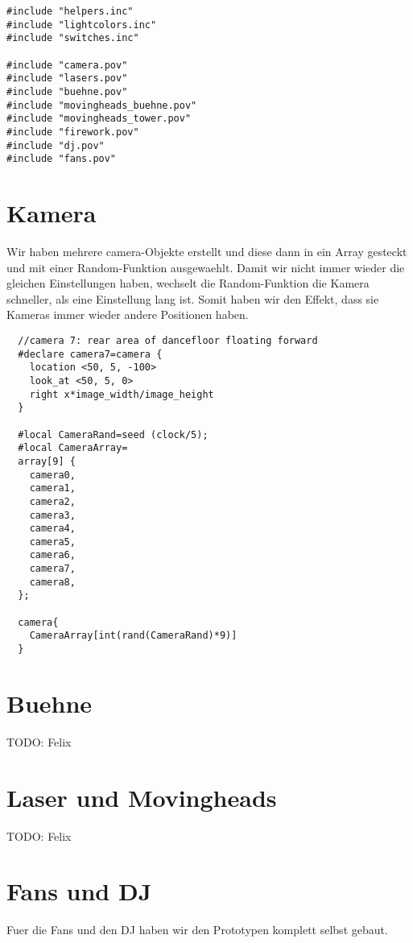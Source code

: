 \documentclass[paper=a4]{scrartcl}
\begin{document}
\begin{lstlisting}
#include "helpers.inc"
#include "lightcolors.inc"
#include "switches.inc"

#include "camera.pov"
#include "lasers.pov"
#include "buehne.pov"
#include "movingheads_buehne.pov"
#include "movingheads_tower.pov"
#include "firework.pov"
#include "dj.pov"
#include "fans.pov"
\end{lstlisting}

\section{Kamera}
Wir haben mehrere camera-Objekte erstellt und diese dann in ein Array gesteckt und mit einer Random-Funktion ausgewaehlt.
Damit wir nicht immer wieder die gleichen Einstellungen haben, wechselt die Random-Funktion die Kamera schneller, als eine Einstellung lang ist.
Somit haben wir den Effekt, dass sie Kameras immer wieder andere Positionen haben.
\begin{lstlisting}
  //camera 7: rear area of dancefloor floating forward
  #declare camera7=camera {
    location <50, 5, -100>
    look_at <50, 5, 0>
    right x*image_width/image_height
  }

  #local CameraRand=seed (clock/5);
  #local CameraArray=
  array[9] {
    camera0,
    camera1,
    camera2,
    camera3,
    camera4,
    camera5,
    camera6,
    camera7,
    camera8,
  };

  camera{
    CameraArray[int(rand(CameraRand)*9)]
  }
\end{lstlisting}

\section{Buehne}
TODO: Felix
\section{Laser und Movingheads}
TODO: Felix
\section{Fans und DJ}
Fuer die Fans und den DJ haben wir den Prototypen komplett selbst gebaut.
\end{document}
